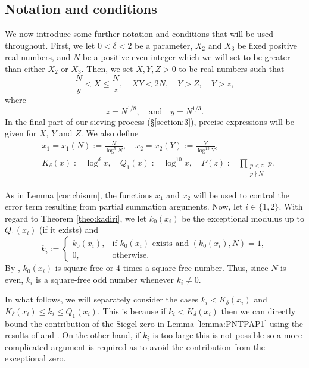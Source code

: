 \documentclass[12pt]{amsart}
\begin{document}
\subsection{Notation and conditions}\label{notationsect}
We now introduce some further notation and conditions that will be used throughout. First, we let $0<\delta<2$ be a parameter, $X_2$ and $X_3$ be fixed positive real numbers, and $N$ be a positive even integer which we will set to be greater than either $X_2$ or $X_3$. Then, we set $X,Y,Z>0$ to be real numbers such that 
\begin{equation}\label{XYZdef}
\frac{N}{y}<X\le \frac{N}{z}, \quad XY<2N, \quad Y>Z, \quad Y>z,
\end{equation}
where
\begin{equation} \label{eq: def-z-y}
    z=N^{1/8},\quad\text{and}\quad y=N^{1/3}.
\end{equation}
In the final part of our sieving process (\S \ref{section:3}), precise expressions will be given for $X$, $Y$ and $Z$. We also define
\begin{align}
    &x_1=x_1(N):=\frac{N}{\log^{5} N},\quad x_2=x_2(Y):=\frac{Y}{\log^{15} Y},\label{notcon1}\\
    &K_{\delta}(x)
    :=\log^\delta x,\quad Q_1(x):=\log^{10}x,\quad P(z):=\prod_{\substack{p<z\\p\nmid N}}p.\label{notcon2}
\end{align}

As in Lemma \ref{cor:chisum}, the functions $x_1$ and $x_2$ will be used to control the error term resulting from partial summation arguments. Now, let $i\in\{1,2\}$. With regard to Theorem \ref{theo:kadiri}, we let $k_0(x_i)$ be the exceptional modulus up to $Q_1(x_i)$ (if it exists) and
\begin{equation}
\label{eq:k11}
    k_i:=
    \begin{cases}
        k_0(x_i),&\text{if $k_0(x_i)$ exists and $(k_0(x_i),N)=1$},\\
        0,&\text{otherwise.}
    \end{cases}
\end{equation}
By \cite[pp. 296--297]{M-V2}, $k_0(x_i)$ is square-free or 4 times a square-free number. Thus, since $N$ is even, $k_i$ is a square-free odd number whenever $k_i \ne 0$. 

In what follows, we will separately consider the cases $k_i<K_{\delta}(x_i)$ and $K_{\delta}(x_i)\le k_i\le Q_1(x_i)$. This is because if $k_i<K_{\delta}(x_i)$ then we can directly bound the contribution of the Siegel zero in Lemma \ref{lemma:PNTPAP1} using the results of \cite{Bordignon1} and \cite{Bordignon2}. On the other hand, if $k_i$ is too large this is not possible so a more complicated argument is required as to avoid the contribution from the exceptional zero.
\end{document}
